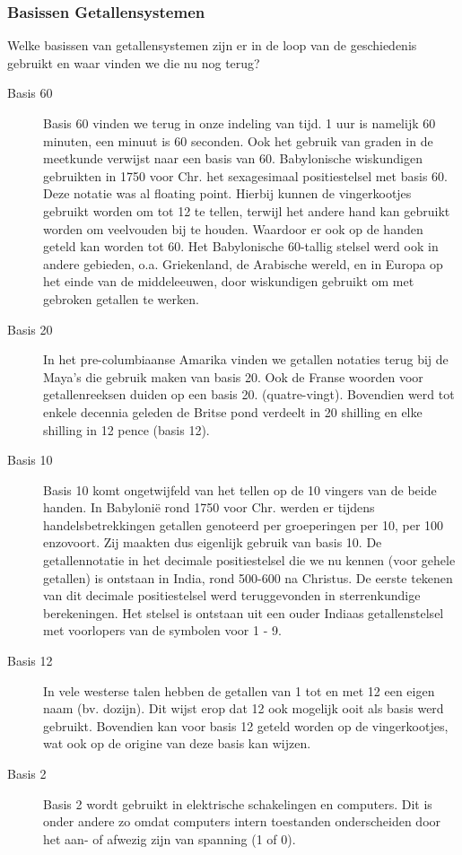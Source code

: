 \documentclass[../main.tex]{subfiles}
\begin{document}
\subsubsection{Basissen Getallensystemen}
\begin{question}
Welke basissen van getallensystemen zijn er in de loop van de geschiedenis gebruikt en waar vinden we die nu nog terug?
\end{question}

\begin{solution}
\begin{description}
		\item[Basis 60] Basis 60 vinden we terug in onze indeling van tijd. 1 uur is namelijk 60 minuten, een minuut is 60 seconden. Ook het gebruik van graden in de meetkunde verwijst naar een basis van 60. Babylonische wiskundigen gebruikten in 1750 voor Chr. het sexagesimaal positiestelsel met basis 60. Deze notatie was al floating point. Hierbij kunnen de vingerkootjes gebruikt worden om tot 12 te tellen, terwijl het andere hand kan gebruikt worden om veelvouden bij te houden. Waardoor er ook op de handen geteld kan worden tot 60.
		Het Babylonische 60-tallig stelsel werd ook in andere gebieden, o.a. Griekenland, de Arabische wereld, en in Europa op het einde van de middeleeuwen, door wiskundigen gebruikt om met gebroken getallen te werken.
		\item[Basis 20] In het pre-columbiaanse Amarika vinden we getallen notaties terug bij de Maya's die gebruik maken van basis 20. Ook de Franse woorden voor getallenreeksen duiden op een basis 20.
		(quatre-vingt). Bovendien werd tot enkele decennia geleden de Britse pond verdeelt in 20 shilling en elke shilling in 12 pence (basis 12).
		\item[Basis 10] Basis 10 komt ongetwijfeld van het tellen op de 10 vingers van de beide handen. In Babyloni\"e rond 1750 voor Chr. werden er tijdens handelsbetrekkingen getallen genoteerd per groeperingen per 10, per 100 enzovoort. Zij maakten dus eigenlijk gebruik van basis 10. De getallennotatie in het decimale positiestelsel die we nu kennen (voor gehele getallen) is ontstaan in India, rond 500-600 na Christus. De eerste tekenen van dit decimale positiestelsel werd teruggevonden in sterrenkundige berekeningen. Het stelsel is ontstaan uit een ouder Indiaas getallenstelsel met voorlopers van de symbolen voor 1 - 9.
		\item[Basis 12] In vele westerse talen hebben de getallen van 1 tot en met 12 een eigen naam (bv. dozijn). Dit wijst erop dat 12 ook mogelijk ooit als basis werd gebruikt. Bovendien kan voor basis 12 geteld worden op de vingerkootjes, wat ook op de origine van deze basis kan wijzen.
		\item[Basis 2] Basis 2 wordt gebruikt in elektrische schakelingen en computers. Dit is onder andere zo omdat computers intern toestanden onderscheiden door het aan- of afwezig zijn van spanning (1 of 0).
\end{description}
\end{solution}
\end{document}
